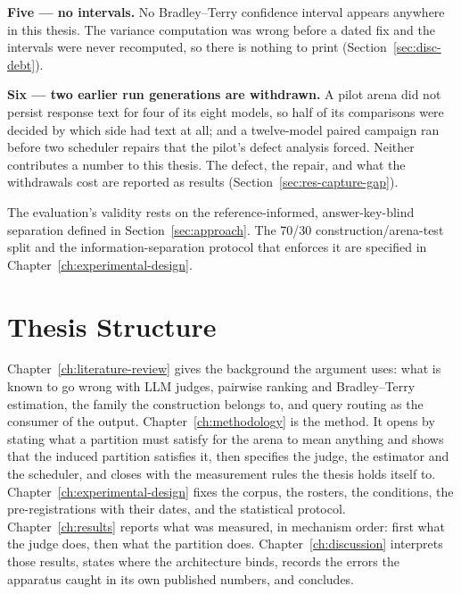 \textbf{Five --- no intervals.} No Bradley--Terry confidence interval
appears anywhere in this thesis. The variance computation was wrong
before a dated fix and the intervals were never recomputed, so there is
nothing to print (Section~\ref{sec:disc-debt}).

\textbf{Six --- two earlier run generations are withdrawn.} A pilot
arena did not persist response text for four of its eight models, so
half of its comparisons were decided by which side had text at all;
and a twelve-model paired campaign ran before two scheduler repairs
that the pilot's defect analysis forced. Neither contributes a
number to this thesis. The defect, the repair, and what the
withdrawals cost are reported as results
(Section~\ref{sec:res-capture-gap}).

The evaluation's validity rests on the reference-informed,
answer-key-blind separation defined in Section~\ref{sec:approach}. The
70/30 construction/arena-test split and the information-separation
protocol that enforces it are specified in
Chapter~\ref{ch:experimental-design}.

\section{Thesis Structure}\label{sec:thesis-structure}

Chapter~\ref{ch:literature-review} gives the background the argument
uses: what is known to go wrong with LLM judges, pairwise ranking and
Bradley--Terry estimation, the family the construction belongs to, and
query routing as the consumer of the output.
Chapter~\ref{ch:methodology} is the method. It opens by stating what a
partition must satisfy for the arena to mean anything and shows that
the induced partition satisfies it, then specifies the judge, the
estimator and the scheduler, and closes with the measurement rules
the thesis holds itself to.
Chapter~\ref{ch:experimental-design} fixes the corpus, the rosters, the
conditions, the pre-registrations with their dates, and the statistical
protocol.
Chapter~\ref{ch:results} reports what was measured, in mechanism order:
first what the judge does, then what the partition does.
Chapter~\ref{ch:discussion} interprets those results, states where the
architecture binds, records the errors the apparatus caught in its own
published numbers, and concludes.

